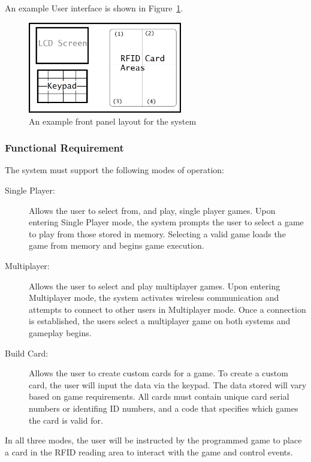 \documentclass[12pt]{article} %
\begin{document}
An example User interface is shown in Figure~\ref{fig:exampleFrontPanel}.

\begin{figure}[h]
	\centering
	\includegraphics[width=0.6\textwidth]{images/exampleFrontPanel.png}
	\caption{An example front panel layout for the system}
	\label{fig:exampleFrontPanel}
\end{figure}

\subsubsection{Functional Requirement}

The system must support the following modes of operation:

\begin{description}
	\item[Single Player:] Allows the user to select from, and play, single player
		games. Upon entering Single Player mode, the system prompts the user to
		select a game to play from those stored in memory. Selecting a valid game
		loads the game from memory and begins game execution.
	\item[Multiplayer:] Allows the user to select and play multiplayer games.
		Upon entering Multiplayer mode, the system activates wireless communication
		and attempts to connect to other users in Multiplayer mode. Once a
		connection is established, the users select a multiplayer game on both
		systems and gameplay begins.
	\item[Build Card:] Allows the user to create custom cards for a game. To
		create a custom card, the user will input the data via the keypad. The data
		stored will vary based on game requirements. All cards must contain unique
		card serial numbers or identifing ID numbers, and a code that specifies
		which games the card is valid for.
\end{description}

In all three modes, the user will be instructed by the programmed game to place
a card in the RFID reading area to interact with the game and control events. 
\end{document}

